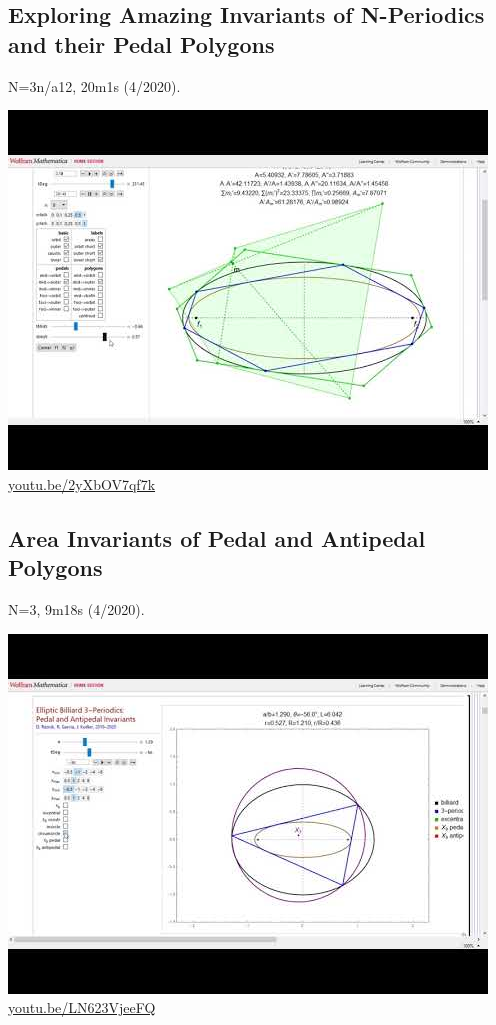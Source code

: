 \documentclass[12pt]{amsart}
\begin{document}
\subsection{Exploring Amazing Invariants of N-Periodics and their Pedal Polygons}
\label{vid:2yXbOV7qf7k}
\noindent N=3n/a12, 20m1s (4/2020). 
\begin{center}\includegraphics[width=.5\textwidth]{pics/2yXbOV7qf7k.jpg} \\ 
\href{https://youtu.be/2yXbOV7qf7k}{\url{youtu.be/2yXbOV7qf7k}}\end{center}
% 

\subsection{Area Invariants of Pedal and Antipedal Polygons}
\label{vid:LN623VjeeFQ}
\noindent N=3, 9m18s (4/2020). 
\begin{center}\includegraphics[width=.5\textwidth]{pics/LN623VjeeFQ.jpg} \\ 
\href{https://youtu.be/LN623VjeeFQ}{\url{youtu.be/LN623VjeeFQ}}\end{center}
% 
\end{document}
